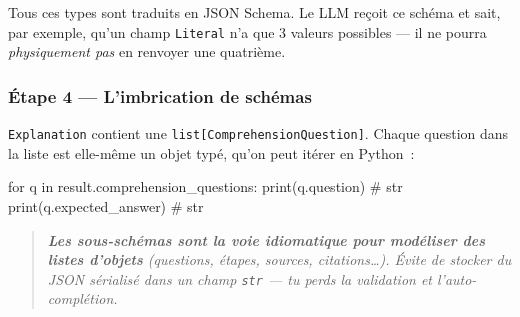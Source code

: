 \documentclass[11pt,a4paper]{article}
\begin{document}
Tous ces types sont traduits en JSON Schema. Le LLM reçoit ce schéma et
sait, par exemple, qu'un champ \texttt{Literal} n'a que 3 valeurs
possibles — il ne pourra \emph{physiquement pas} en renvoyer une quatrième.

\subsubsection*{Étape 4 — L'imbrication de schémas}

\begin{center}
\end{center}

\texttt{Explanation} contient une \texttt{list[ComprehensionQuestion]}.
Chaque question dans la liste est elle-même un objet typé, qu'on peut
itérer en Python~:

\begin{pythoncode}
for q in result.comprehension_questions:
    print(q.question)            # str
    print(q.expected_answer)     # str
\end{pythoncode}

\begin{quote}\itshape
\textbf{Les sous-schémas sont la voie idiomatique pour modéliser des listes
d'objets} (questions, étapes, sources, citations\dots). Évite de stocker du
JSON sérialisé dans un champ \texttt{str} — tu perds la validation et
l'auto-complétion.
\end{quote}
\end{document}
